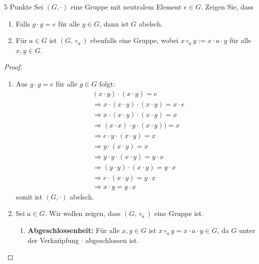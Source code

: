 \documentclass{problemset}
\begin{document}
\begin{problem} {5 Punkte}
Sei $(G, \cdot)$ eine Gruppe mit neutralem Element $e \in G$. Zeigen Sie, dass
\begin{enumerate}
	\item Falls $g \cdot g = e$ für alle $g \in G$, dann ist $G$ abelsch.
	\item Für $a \in G$ ist $(G, \circ_a)$ ebenfalls eine Gruppe, wobei $x \circ_a y := x \cdot a \cdot y$ für alle $x, y \in G$.
\end{enumerate}
\begin{proof}
	$ $

	\begin{enumerate}
		\item Aus $g \cdot g = e$ für alle $g \in G$ folgt: \begin{align*}
			       & (x \cdot y) \cdot (x \cdot y) = e \tag{$x \cdot y \in G \Longrightarrow \exists g \in G: g \cdot g = e$} \\
			       & \Longrightarrow x \cdot (x \cdot y) \cdot (x \cdot y) = x \cdot e                                        \\
			       & \Longrightarrow x \cdot (x \cdot y) \cdot (x \cdot y) = x                                                \\
			       & \Longrightarrow (x \cdot x) \cdot y \cdot (x \cdot y)) = x                                               \\
			       & \Longrightarrow e \cdot y \cdot (x \cdot y) = x                                                          \\
			       & \Longrightarrow y \cdot (x \cdot y) = x                                                                  \\
			       & \Longrightarrow y \cdot y \cdot (x \cdot y) = y \cdot x                                                  \\
			       & \Longrightarrow (y \cdot y) \cdot (x \cdot y) = y \cdot x                                                \\
			       & \Longrightarrow e \cdot (x \cdot y) = y \cdot x                                                          \\
			       & \Longrightarrow x \cdot y = y \cdot x
		      \end{align*}
		      somit ist $(G, \cdot)$ abelsch. \checkmark

		\item Sei $a \in G$. Wir wollen zeigen, dass $(G, \circ_a)$ eine Gruppe ist.
		      \begin{enumerate}
			      \item \textbf{Abgeschlossenheit:} Für alle $x, y \in G$ ist $x \circ_a y = x \cdot a \cdot y \in G$, da $G$ unter der Verknüpfung $\cdot$ abgeschlossen ist.


\end{enumerate}
\end{enumerate}
\end{proof}
\end{problem}
\end{document}
